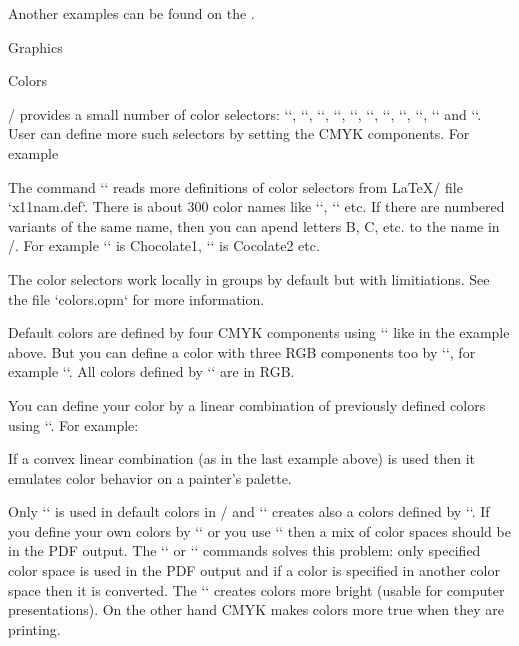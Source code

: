 {Another examples can be found on the 
.


\sec Graphics

\secc Colors

\OpTeX/ provides a small number of color selectors: 
{\Blue `\Blue`}, 
{\Red `\Red`}, 
{\Brown `\Brown`},
{\Green `\Green`}, 
{\Yellow `\Yellow`}, 
{\Cyan `\Cyan`}, 
{\Magenta `\Magenta`}, 
{`\White`}, 
{\Grey `\Grey`}, 
{\LightGrey `\LightGrey`} and
`\Black`. User can define more
such selectors by setting the CMYK components. For example

\begtt
\def \Orange {\setcmykcolor{0 0.5 1 0}}
\endtt

\new
The command `\morecolors` reads more definitions of color selectors 
from \LaTeX/ file `x11nam.def`. There is about 300 color names like 
`\DeepPink`, `\Chocolate` etc. If there are numbered variants of the same
name, then you can apend letters B, C, etc. to the name in \OpTeX/. For example 
`\Chocolate` is Chocolate1, `\ChocolateB` is Cocolate2 etc.

\new
The color selectors work locally in groups by default but with limitiations. See 
the file `colors.opm` for more information.

Default colors are defined by four CMYK components using `\setcmykcolor` like in
the example above. But you can define a color with three RGB components too by
`\setrgbcolor`, for example `\def\Orange{\setrgbcolor{1 0.5 0}}`. All colors
defined by `\morecolors` are in RGB.

\new
You can define your color by a linear combination of previously defined colors using
``. For example:

\begtt
{} \myCyan {.3\Green + .5\Blue}  %
 \DarkBlue {\Blue + .4\Black}  %
 \myGreen{\Cyan+\Yellow}       %
{} \MyColor {.3\Orange+.5\Green+.2\Yellow}
\endtt
%
If a convex linear combination (as in the last example above) is used then it
emulates color behavior on a painter's palette. 

Only `\setcmykcolor` is used in default colors in \OpTeX/ and ``
creates also a colors defined by `\setcmykcolor`. If you define your own
colors by `\setrgbcolor` or you use `\morecolors` then a mix of color spaces
should be in the PDF output. The `\onlyrgb` or `\onlycmyk` commands solves
this problem: only specified color space is used in the
PDF output and if a color is specified in another color space then it is
converted. The `\onlyrgb` creates colors more bright (usable for computer
presentations). On the other hand CMYK makes colors more true when 
they are printing.

}
